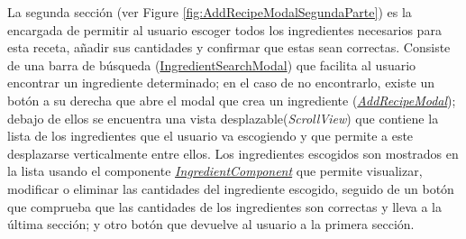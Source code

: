 \documentclass[twoside, openright, 11pt]{report}
\begin{document}
					La segunda sección (ver Figure \ref{fig:AddRecipeModalSegundaParte}) es la encargada de permitir al usuario escoger todos los ingredientes necesarios para esta receta, añadir sus cantidades y confirmar que estas sean correctas. Consiste de una barra de búsqueda (\hyperref[IngredientSearchModal]{IngredientSearchModal}) que facilita al usuario encontrar un ingrediente determinado; en el caso de no encontrarlo, existe un botón a su derecha que abre el modal que crea un ingrediente (\textit{\hyperref[AddRecipeModal]{AddRecipeModal}}); debajo de ellos se encuentra una vista desplazable(\textit{ScrollView}) que contiene la lista de los ingredientes que el usuario va escogiendo y que permite a este desplazarse verticalmente entre ellos. Los ingredientes escogidos son mostrados en la lista usando el componente \hyperref[IngredientComponent]{\textit{IngredientComponent}} que permite visualizar, modificar o eliminar las cantidades del ingrediente escogido, seguido de un botón que comprueba que las cantidades de los ingredientes son correctas y lleva a la última sección; y otro botón que devuelve al usuario a la primera sección.
							
\end{document}
